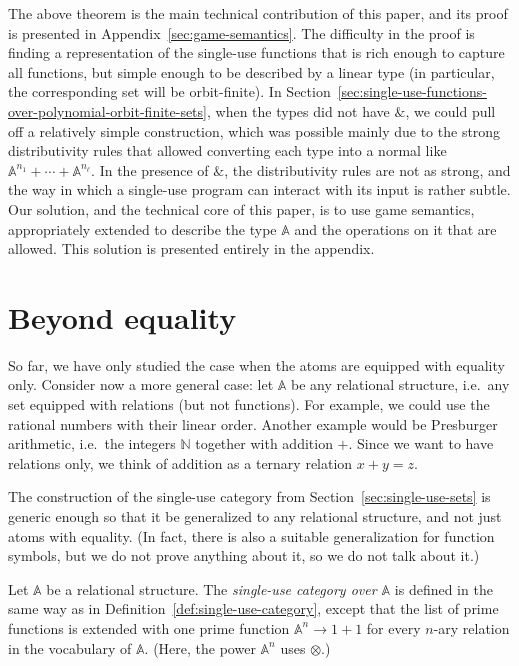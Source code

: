 \documentclass[10pt,a4paper]{amsart}
\numberwithin{equation}{section}
\theoremstyle{plain}
\newcommand{\Nat}{{\mathbb N}}
\newcommand{\atoms}{\mathbb A}
\begin{document}
The above theorem is the main technical contribution of this paper, and its proof is presented in Appendix~\ref{sec:game-semantics}. The difficulty in the proof is finding a representation of the single-use  functions that is rich enough to capture all functions, but simple enough to be described by a linear type (in particular, the corresponding set will be orbit-finite). In  Section~\ref{sec:single-use-functions-over-polynomial-orbit-finite-sets}, when the types did not have $\&$, we could pull off a relatively simple construction, which was possible mainly due to the strong distributivity rules that allowed converting each type into a normal like $\atoms^{n_1} + \cdots + \atoms^{n_\ell}$. In the presence of $\&$, the distributivity rules are not as strong, and the way in which a single-use program can interact with its input is rather subtle. 
Our solution, and the technical core of this paper, is to use game semantics, appropriately extended to describe the type $\atoms$ and the operations on it that are allowed. This solution is presented entirely in the appendix.










\section{Beyond equality}
\label{sec:beyond-equality}

So far, we have only studied the case when the atoms are equipped with equality only. Consider now a more general case: let $\atoms$ be any relational structure, i.e.~any set equipped with relations (but not functions). For example, we could use the rational numbers with their linear order. Another example would be Presburger arithmetic, i.e.~the integers $\Nat$ together with addition $+$. Since we want to have relations only, we think of addition as a ternary relation $x + y =z$. 

The construction of the single-use category from Section~\ref{sec:single-use-sets} is generic enough so that it be generalized to any relational structure, and not just atoms with equality. (In fact, there is also a suitable generalization for function symbols, but we do not prove anything about it, so we do not talk about it.)

\begin{definition}\label{def:single-use-category-relational-structures}
    Let $\atoms$ be a relational structure. The \emph{single-use category over $\atoms$} is defined in the same way as in Definition~\ref{def:single-use-category}, except that the list of prime functions is extended with one prime function  $\atoms^n \to 1 + 1$ 
        for every $n$-ary relation in the vocabulary of $\atoms$. (Here, the power $\atoms^n$ uses $\otimes$.)
\end{definition}
\end{document}
